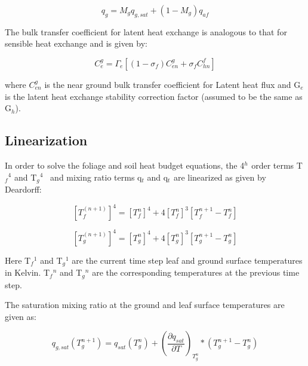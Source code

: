 \begin{equation}
{q_g} = {M_g}{q_{g,sat}} + \left( {1 - {M_g}} \right){q_{af}}
\end{equation}

The bulk transfer coefficient for latent heat exchange is analogous to that for sensible heat exchange and is given by:

\begin{equation}
C_e^g = {\Gamma_e}\left[ {\left( {1 - {\sigma_f}} \right)C_{en}^g + {\sigma_f}C_{hn}^f} \right]
\end{equation}

where \(C_{en}^g\) is the near ground bulk transfer coefficient for Latent heat flux and G\(_{e}\) is the latent heat exchange stability correction factor (assumed to be the same as G\(_{h}\)).

\subsection{Linearization}\label{linearization}

In order to solve the foliage and soil heat budget equations, the 4\(^{h}\) \(^{ }\)order terms T\(_{f}\)\(^{4}\) and T\(_{g}\)\(^{4}\) ~and mixing ratio terms q\(_{t}\) and q\(_{t}\) \(_{ }\)are linearized as given by Deardorff:

\begin{equation}
{\left[ {T_f^{\left( {n + 1} \right)}} \right]^4} = {\left[ {T_f^n} \right]^4} + 4{\left[ {T_f^n} \right]^3}\left[ {T_f^{n + 1} - T_f^n} \right]
\end{equation}

\begin{equation}
{\left[ {T_g^{\left( {n + 1} \right)}} \right]^4} = {\left[ {T_g^n} \right]^4} + 4{\left[ {T_g^n} \right]^3}\left[ {T_g^{n + 1} - T_g^n} \right]
\end{equation}

Here T\(_{f}\)\(^{1}\) and T\(_{g}\)\(^{1}\) are the current time step leaf and ground surface temperatures in Kelvin. T\(_{f}\)\(^{n}\) and T\(_{g}\)\(^{n}\) are the corresponding temperatures at the previous time step.

The saturation mixing ratio at the ground and leaf surface temperatures are given as:

\begin{equation}
{q_{g,sat}}\left( {T_g^{n + 1}} \right) = {q_{sat}}\left( {T_g^n} \right) + {\left( {\frac{{\partial {q_{sat}}}}{{\partial T}}} \right)_{T_g^n}} * \left( {T_g^{n + 1} - T_g^n} \right)
\end{equation}

